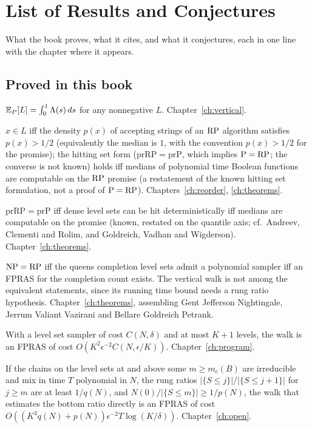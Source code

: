 \chapter{List of Results and Conjectures}
\label{app:results}

What the book proves, what it cites, and what it conjectures, each in one line with the chapter where it appears.

\section*{Proved in this book}

\begin{description}[style=nextline]
\item[Lorenz identity] $\mathbb{E}_P[L] = \int_0^1 \Lambda(s) \, ds$ for any nonnegative $L$. Chapter~\ref{ch:vertical}.
\item[Quantile form of RP] $x \in L$ iff the density $p(x)$ of accepting strings of an $\mathrm{RP}$ algorithm satisfies $p(x) > 1/2$ (equivalently the median is $1$, with the convention $p(x) > 1/2$ for the promise); the hitting set form ($\mathrm{prRP} = \mathrm{prP}$, which implies $\mathrm{P} = \mathrm{RP}$; the converse is not known) holds iff medians of polynomial time Boolean functions are computable on the $\mathrm{RP}$ promise (a restatement of the known hitting set formulation, not a proof of $\mathrm{P} = \mathrm{RP}$). Chapters~\ref{ch:reorder}, \ref{ch:theorems}.
\item[Promise form] $\mathrm{prRP} = \mathrm{prP}$ iff dense level sets can be hit deterministically iff medians are computable on the promise (known, restated on the quantile axis; cf.\ Andreev, Clementi and Rolim, and Goldreich, Vadhan and Wigderson). Chapter~\ref{ch:theorems}.
\item[Main equivalence] $\mathrm{NP} = \mathrm{RP}$ iff the queens completion level sets admit a polynomial sampler iff an FPRAS for the completion count exists. The vertical walk is not among the equivalent statements, since its running time bound needs a rung ratio hypothesis. Chapter~\ref{ch:theorems}, assembling Gent Jefferson Nightingale, Jerrum Valiant Vazirani and Bellare Goldreich Petrank.
\item[Conditional FPRAS] With a level set sampler of cost $C(N, \delta)$ and at most $K + 1$ levels, the walk is an FPRAS of cost $O(K^2 \epsilon^{-2} C(N, \epsilon/K))$. Chapter~\ref{ch:program}.
\item[Rung skipping] If the chains on the level sets at and above some $m \ge m_c(B)$ are irreducible and mix in time $T$ polynomial in $N$, the rung ratios $|\{S \le j\}|/|\{S \le j+1\}|$ for $j \ge m$ are at least $1/q(N)$, and $N(0)/|\{S \le m\}| \ge 1/p(N)$, the walk that estimates the bottom ratio directly is an FPRAS of cost $O((K^3 q(N) + p(N)) \epsilon^{-2} T \log (K/\delta))$. Chapter~\ref{ch:open}.

\end{description}
